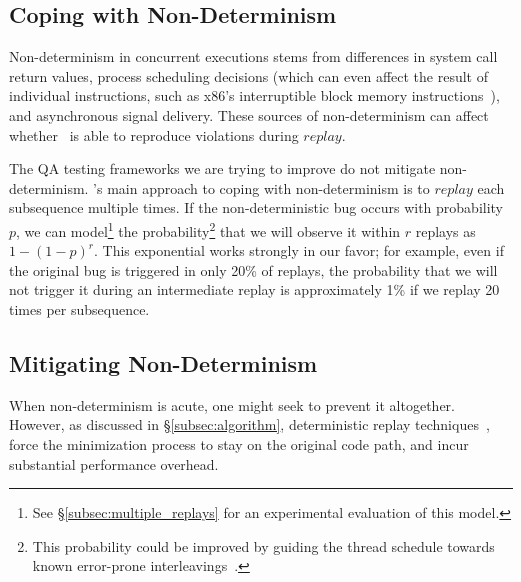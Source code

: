 \subsection{Coping with Non-Determinism}
\label{subsec:coping}

Non-determinism in concurrent executions stems from
differences in system call return values, process scheduling decisions (which can
even affect the result of individual instructions, such as x86's
interruptible block memory instructions~\cite{Dunlap:2002:REI:844128.844148}),
and asynchronous signal
delivery. These sources of non-determinism can affect whether \projectname~is
able to reproduce violations during $replay$.

The QA testing frameworks we are
trying to improve do not mitigate non-determinism.
\projectname's main approach to coping with non-determinism
is to $replay$ each subsequence multiple times. If the non-deterministic bug occurs with
probability $p$, we can model\footnote{See
\S\ref{subsec:multiple_replays} for an experimental evaluation of this model.}
 the probability\footnote{This probability could be improved by guiding the thread schedule
towards known error-prone interleavings~\cite{park2009ctrigger,park2009pres}.}
that we will observe it within $r$ replays as $1-(1-p)^{r}$. This exponential
works strongly in our favor; for example, even if the original bug is
triggered in only 20\% of replays, the probability that we will not trigger
it during an intermediate replay is approximately
1\% if we replay 20 times per subsequence.

\subsection{Mitigating Non-Determinism}
\label{subsec:mitigating}

When non-determinism is acute, one might seek to prevent it altogether.
However, as discussed in \S\ref{subsec:algorithm}, deterministic replay techniques~\cite{Dunlap:2002:REI:844128.844148,Geels:2006:RDD:1267359.1267386},
force the minimization process to stay on the original code path, and incur
substantial performance overhead.

